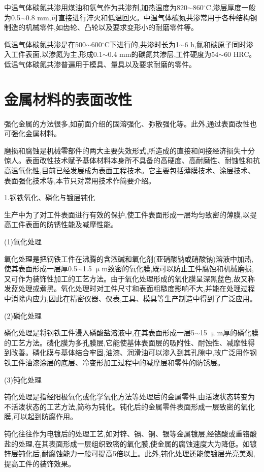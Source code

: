 \documentclass[UTF8]{ctexbook}
\newcommand{\◎}{\ensuremath{\bigcirc}}
\begin{document}
中温气体碳氮共渗用煤油和氨气作为共渗剂,加热温度为820$\sim$860$^\circ$C,渗层厚度一般为0.5$\sim$0.8 mm,可直接进行淬火和低温回火。中温气体碳氮共渗常用于各种结构钢制造的机械零件,如齿轮、凸轮以及要求变形小的耐磨零件等。

低温气体碳氮共渗是在500$\sim$600$^\circ$C下进行的,共渗时长为1$\sim$6 h,氮和碳原子同时渗入工件表面,以渗氮为主,形成0.1$\sim$0.4 mm的碳氮共渗层,工件硬度为54$\sim$60 HRC。低温气体碳氮共渗普遍用于模具、量具以及要求耐磨的零件。

\section{金属材料的表面改性}

强化金属的方法很多,如前面介绍的固溶强化、弥散强化等。此外,通过表面改性也可强化金属材料。

磨损和腐蚀是机械零部件的两大主要失效形式,所造成的直接和间接经济损失十分惊人。表面改性技术赋予基体材料本身所不具备的高硬度、高耐磨性、耐蚀性和抗高温氧化性,目前已经发展成为表面工程技术。它主要包括薄膜技术、涂层技术、表面强化技术等,本节只对常用技术作简要介绍。

1.钢铁氧化、磷化与镀层钝化

生产中为了对工件表面进行有效的保护,使工件表面形成一层均匀致密的薄膜,以提高工件表面的防锈性能及减摩性能。

(1)氧化处理

氧化处理是把钢铁工件在沸腾的含浓碱和氧化剂(亚硝酸钠或硝酸钠)溶液中加热,使其表面形成一层厚0.5$\sim$1.5 $\upmu$m致密的氧化膜,既可以防止工件腐蚀和机械磨损,又可作为装饰性加工的工艺方法。由于氧化处理形成的氧化膜呈深黑蓝色,故又称发蓝处理或煮黑。氧化处理时对工件尺寸和表面粗糙度影响不大,并能在处理过程中消除内应力,因此在精密仪器、仪表,工具、模具等生产制造中得到了广泛应用。

(2)磷化处理

磷化处理是将钢铁工件浸入磷酸盐溶液中,在其表面形成一层5$\sim$15 $\upmu$m厚的磷化膜的工艺方法。磷化膜为多孔膜层,它能使基体表面层的吸附性、耐蚀性、减摩性得到改善。磷化膜与基体结合牢固,油漆、润滑油可以渗入到其孔隙中,故广泛用作钢铁工件油漆涂层的底层、冷变形加工过程中的减摩层和零件的防锈层。

(3)钝化处理

钝化处理是指经阳极氧化或化学氧化方法等处理后的金属零件,由活泼状态转变为不活泼状态的工艺方法,简称为钝化。钝化后的金属零件表面形成一层致密的氧化膜,可以起到防腐作用。

钝化往往作为电镀后的处理工艺,如对锌、镉、铜、银等金属镀层,经铬酸或重铬酸盐的处理,在其表面形成一层组织致密的氧化膜,使金属的腐蚀速度大为降低。如镀锌层钝化后,耐腐蚀能力一般可提高5倍以上。此外,钝化处理还能使镀层光亮美观,提高工件的装饰效果。
\end{document}
